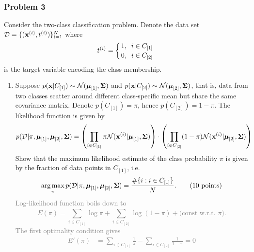 \documentclass[12pt,a4paper]{article}
\newcommand{\gray}[1]{\textcolor{gray}{#1}}
\renewcommand{\v}[1]{\ifmmode\mathbf{#1}\fi}
\renewcommand{\l}{\left}
\renewcommand{\r}{\right}
\newcommand{\SUM}[2]{\sum\limits_{#1}^{#2}}
\DeclareMathOperator*{\argmax}{arg\,max}
\newcommand{\solution}[1]{\gray{#1}}
\begin{document}
\newpage
\subsubsection*{Problem 3}
Consider the two-class classification problem. Denote the data set $\mathcal D = \{(\v x^{(i)}, t^{(i)}) \}_{i=1}^N$ where 
\begin{equation*}
t^{(i)} = \l\{{1, \;\; i \in C_{[1]} \atop 0, \;\; i \in C_{[2]}} \r.
\end{equation*}
is the target variable encoding the class membership. 
%
\begin{enumerate}[label=(\alph*)]
%
\item Suppose $p(\v x \vert C_{[1]}) \sim \mathcal N(\boldsymbol\mu_{[1]}, \boldsymbol\Sigma)$ and $p(\v x \vert C_{[2]}) \sim \mathcal N(\boldsymbol\mu_{[2]}, \boldsymbol\Sigma)$, that is, data from two classes scatter around different class-specific mean but share the same covariance matrix. Denote $p(C_{[1]}) = \pi$, hence $p(C_{[2]}) = 1-\pi$. The likelihood function is given by 
\begin{equation*}
\begin{split}
p(\mathcal D \vert \pi, \boldsymbol\mu_{[1]}, \boldsymbol\mu_{[2]}, \boldsymbol\Sigma) 
& = \l(\prod_{i\in C_{[1]}} \pi \mathcal N(\v x^{(i)} \vert \boldsymbol\mu_{[1]}, \boldsymbol\Sigma)  \r) 
\cdot \l(\prod_{i\in C_{[2]}} (1-\pi)  \mathcal N(\v x^{(i)} \vert \boldsymbol\mu_{[2]}, \boldsymbol\Sigma)\r)
\end{split}
\end{equation*}
Show that the maximum likelihood estimate of the class probability $\pi$ is given by the fraction of data points in $C_{[1]}$, i.e.
\begin{equation*}
\argmax_{\pi} p(\mathcal D \vert \pi, \boldsymbol\mu_{[1]}, \boldsymbol\mu_{[2]}, \boldsymbol\Sigma) = \frac{ \#\{i : i \in C_{[1]} \} 
}N. \hskip20pt \text{(10 points)}
\end{equation*}
\solution{
Log-likelihood function boils down to
\begin{equation*}
E(\pi) = \SUM{i\in C_{[1]}}{} \log\pi + \SUM{i\in C_{[2]}}{} \log(1-\pi) + \text{(const w.r.t. $\pi$)}.
\end{equation*}
The first optimality condition gives
\begin{align*}
E'(\pi) &= \SUM{i\in C_{[1]}}{} \frac1\pi - \SUM{i\in C_{[2]}}{} \frac1{1-\pi} = 0 \\

\end{align*}}
\end{enumerate}
\end{document}
